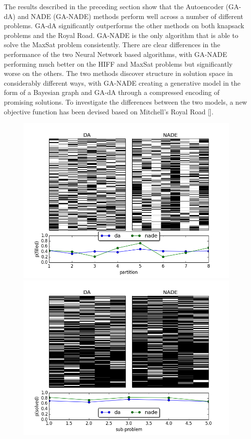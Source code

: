 \documentclass[twoside]{article}
\begin{document}
The results described in the preceding section show that the Autoencoder (GA-dA) and NADE (GA-NADE) methods perform well across a number of different problems. GA-dA significantly outperforms the other methods on both knapsack problems and the Royal Road. GA-NADE is the only algorithm that is able to solve the MaxSat problem consistently. There are clear differences in the performance of the two Neural Network based algorithms, with GA-NADE performing much better on the HIFF and MaxSat problems but significantly worse on the others. The two methods discover structure in solution space in considerably different ways, with GA-NADE creating a generative model in the form of a Bayesian graph and GA-dA through a compressed encoding of promising solutions. To investigate the differences between the two models, a new objective function has been devised based on Mitchell's Royal Road [\cite{mitchell}].
\begin{figure}[t!]
\centering
    \includegraphics[scale=0.6]{nade-vs-da-wide.png}
  \includegraphics[scale=0.6]{nade-vs-da-narrow.png}
  \caption{}
\end{figure}
\end{document}
